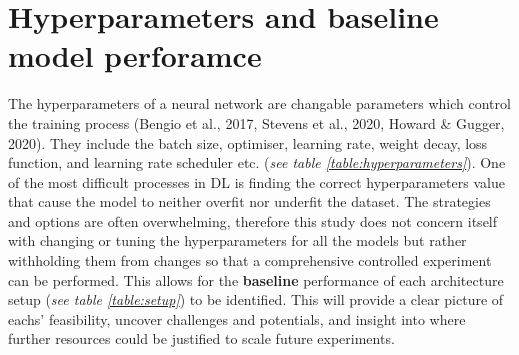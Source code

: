 \documentclass[11pt, a4paper, twoside]{report}
\begin{document}
\begin{table}[H]
  \centering
  \label{table:setup}
  \caption{The U-Nets and the variations thereof selected for this study}
\end{table}

\section{Hyperparameters and baseline model perforamce}

The hyperparameters of a neural network are changable parameters which control the training process (Bengio et al., 2017, Stevens et al., 2020, Howard \& Gugger, 2020). They include the batch size, optimiser, learning rate, weight decay, loss function, and learning rate scheduler etc. (\textit{see table \ref{table:hyperparameters}}). One of the most difficult processes in DL is finding the correct hyperparameters value that cause the model to neither overfit nor underfit the dataset. The strategies and options are often overwhelming, therefore this study does not concern itself with changing or tuning the hyperparameters for all the models but rather withholding them from changes so that a comprehensive controlled experiment can be performed. This allows for the \textbf{baseline} performance of each architecture setup (\textit{see table \ref{table:setup}}) to be identified. This will provide a clear picture of eachs' feasibility, uncover challenges and potentials, and insight into where further resources could be justified to scale future experiments.\\\par
\end{document}
